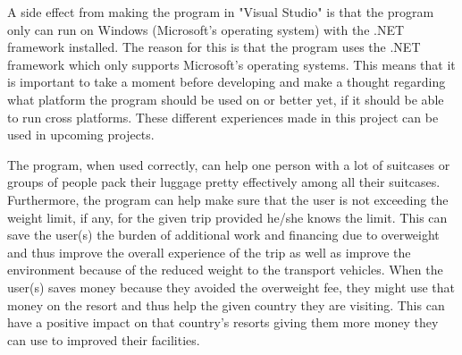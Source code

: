 A side effect from making the program in "Visual Studio" is that the program only can run on Windows (Microsoft's operating system) with the .NET framework installed. The reason for this is that the program uses the .NET framework which only supports Microsoft's operating systems.
This means that it is important to take a moment before developing and make a thought regarding what platform the program should be used on or better yet, if it should be able to run cross platforms.
These different experiences made in this project can be used in upcoming projects.

The program, when used correctly, can help one person with a lot of suitcases or groups of people pack their luggage pretty effectively among all their suitcases. Furthermore, the program can help make sure that the user is not exceeding the weight limit, if any, for the given trip provided he/she knows the limit. This can save the user(s) the burden of additional work and financing due to overweight and thus improve the overall experience of the trip as well as improve the environment because of the reduced weight to the transport vehicles. When the user(s) saves money because they avoided the overweight fee, they might use that money on the resort and thus help the given country they are visiting. This can have a positive impact on that country's resorts giving them more money they can use to improved their facilities.